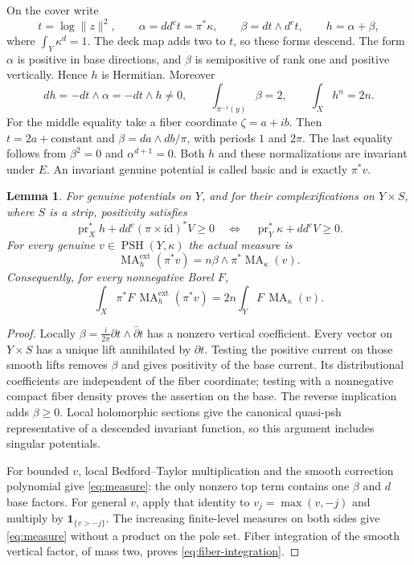 \documentclass[11pt]{article}
\newcommand{\ddc}{dd^c}
\newcommand{\PSH}{\operatorname{PSH}}
\newcommand{\MA}{\operatorname{MA}}
\newtheorem{lemma}[theorem]{Lemma}
\theoremstyle{remark}\newtheorem{remark}[theorem]{Remark}
\begin{document}
On the cover write
\[
 t=\log\lVert z\rVert^2,\qquad
 \alpha=\ddc t=\pi^*\kappa,\qquad
 \beta=dt\wedge d^ct,\qquad h=\alpha+\beta,
\]
where $\int_Y\kappa^d=1$. The deck map adds two to $t$, so these
forms descend. The form $\alpha$ is positive in base directions, and
$\beta$ is semipositive of rank one and positive vertically. Hence $h$
is Hermitian. Moreover
\begin{equation}\label{eq:geometry}
 dh=-dt\wedge\alpha=-dt\wedge h\ne0,
 \qquad \int_{\pi^{-1}(y)}\beta=2,
 \qquad \int_Xh^n=2n.
\end{equation}
For the middle equality take a fiber coordinate $\zeta=a+ib$. Then
$t=2a+\text{constant}$ and $\beta=da\wedge db/\pi$, with periods
$1$ and $2\pi$. The last equality follows from $\beta^2=0$ and
$\alpha^{d+1}=0$. Both $h$ and these normalizations are invariant under
$E$. An invariant genuine potential is called basic and is exactly $\pi^*v$.

\begin{lemma}\label{lem:descent}
For genuine potentials on $Y$, and for their complexifications on
$Y\times S$, where $S$ is a strip, positivity satisfies
\[
 \operatorname{pr}_X^*h+\ddc(\pi\times\mathrm{id})^*V\geq0
 \quad\Longleftrightarrow\quad
 \operatorname{pr}_Y^*\kappa+\ddc V\geq0.
\]
For every genuine $v\in\PSH(Y,\kappa)$ the actual measure is
\begin{equation}\label{eq:measure}
 \MA_h^{\mathrm{ext}}(\pi^*v)
     =n\beta\wedge\pi^*\MA_\kappa(v).
\end{equation}
Consequently, for every nonnegative Borel $F$,
\begin{equation}\label{eq:fiber-integration}
 \int_X\pi^*F\,\MA_h^{\mathrm{ext}}(\pi^*v)
       =2n\int_YF\,\MA_\kappa(v).
\end{equation}
\end{lemma}
\begin{proof}
Locally $\beta=\frac{i}{2\pi}\partial t\wedge\bar\partial t$ has
a nonzero vertical coefficient. Every vector on $Y\times S$ has a unique
lift annihilated by $\partial t$. Testing the positive current on those
smooth lifts removes $\beta$ and gives positivity of the base current.
Its distributional coefficients are independent of the fiber coordinate;
testing with a nonnegative compact fiber density proves the assertion
on the base. The reverse implication adds $\beta\geq0$. Local
holomorphic sections give the canonical quasi-psh representative of a
descended invariant function, so this argument includes singular potentials.

For bounded $v$, local Bedford--Taylor multiplication and the smooth
correction polynomial give \eqref{eq:measure}: the only nonzero top term
contains one $\beta$ and $d$ base factors. For general $v$, apply that
identity to $v_j=\max(v,-j)$ and multiply by
$\mathbf1_{\{v>-j\}}$. The increasing finite-level measures on both
sides give \eqref{eq:measure} without a product on the pole set.
Fiber integration of the smooth vertical factor, of mass two, proves
\eqref{eq:fiber-integration}.
\end{proof}
\end{document}
